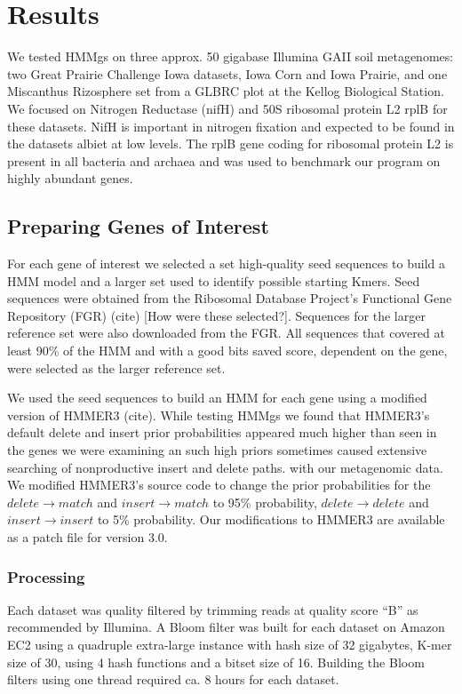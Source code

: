 \documentclass{article}
\begin{document}
\section{Results}
We tested HMMgs on three approx. 50 gigabase Illumina GAII soil metagenomes: two Great Prairie Challenge Iowa datasets, Iowa Corn and Iowa Prairie, and one Miscanthus Rizosphere set from a GLBRC plot at the Kellog Biological Station. We focused on Nitrogen Reductase (nifH) and 50S ribosomal protein L2 rplB for these datasets.  NifH is important in nitrogen fixation and expected to be found in the datasets albiet at low levels. The rplB gene coding for ribosomal protein L2 is present in all bacteria and archaea and was used to benchmark our program on highly abundant genes.

\subsection{Preparing Genes of Interest}
For each gene of interest we selected a set high-quality seed sequences to build a HMM model and a larger set used to identify possible starting Kmers.  Seed sequences were obtained from the Ribosomal Database Project's Functional Gene Repository (FGR) (cite) [How were these selected?].  Sequences for the larger reference set were also downloaded from the FGR.  All sequences that covered at least 90\% of the HMM and with a good bits saved score, dependent on the gene, were selected as the larger reference set.

We used the seed sequences to build an HMM for each gene using a modified version of HMMER3 (cite). While testing HMMgs we found that HMMER3's default delete and insert prior probabilities appeared much higher than seen in the genes we were examining an such high priors sometimes caused extensive searching of nonproductive insert and delete paths. with our metagenomic data. We modified HMMER3's source code to change the prior probabilities for the $delete \rightarrow match$ and $insert \rightarrow match$ to 95\% probability, $delete \rightarrow delete$ and $insert \rightarrow insert$ to 5\% probability.  Our modifications to HMMER3 are available as a patch file for version 3.0.

\subsubsection{Processing}
Each dataset was quality filtered by trimming reads at quality score “B” as recommended by Illumina\cite{Mann2009}.  A Bloom filter was built for each dataset on Amazon EC2 using a quadruple extra-large instance with hash size of 32 gigabytes, K-mer size of 30, using 4 hash functions and a bitset size of 16. Building the Bloom filters using one thread required ca. 8 hours for each dataset.
\end{document}

